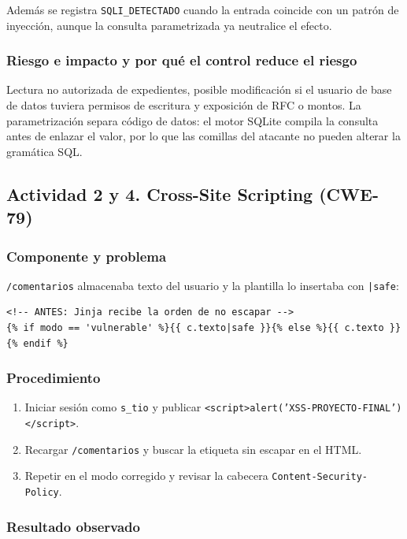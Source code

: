 \documentclass[letterpaper]{article}
\begin{document}
Además se registra \texttt{SQLI\_DETECTADO} cuando la entrada coincide con un patrón de
inyección, aunque la consulta parametrizada ya neutralice el efecto.
\subsubsection{Riesgo e impacto y por qué el control reduce el riesgo}
\label{sec:orgaf04316}

Lectura no autorizada de expedientes, posible modificación si el usuario de base de
datos tuviera permisos de escritura y exposición de RFC o montos. La parametrización
separa código de datos: el motor SQLite compila la consulta antes de enlazar el valor,
por lo que las comillas del atacante no pueden alterar la gramática SQL.
\subsection{Actividad 2 y 4. Cross-Site Scripting (CWE-79)}
\label{sec:orge9ffe79}

\subsubsection{Componente y problema}
\label{sec:orgd7b0a02}

\texttt{/comentarios} almacenaba texto del usuario y la plantilla lo insertaba con \texttt{|safe}:

\begin{verbatim}
<!-- ANTES: Jinja recibe la orden de no escapar -->
{% if modo == 'vulnerable' %}{{ c.texto|safe }}{% else %}{{ c.texto }}{% endif %}
\end{verbatim}
\subsubsection{Procedimiento}
\label{sec:org3d3095e}

\begin{enumerate}
\item Iniciar sesión como \texttt{s\_tio} y publicar
\texttt{<script>alert('XSS-PROYECTO-FINAL')</script>}.
\item Recargar \texttt{/comentarios} y buscar la etiqueta sin escapar en el HTML.
\item Repetir en el modo corregido y revisar la cabecera \texttt{Content-Security-Policy}.
\end{enumerate}
\subsubsection{Resultado observado}
\label{sec:orgba2d0f7}
\end{document}
